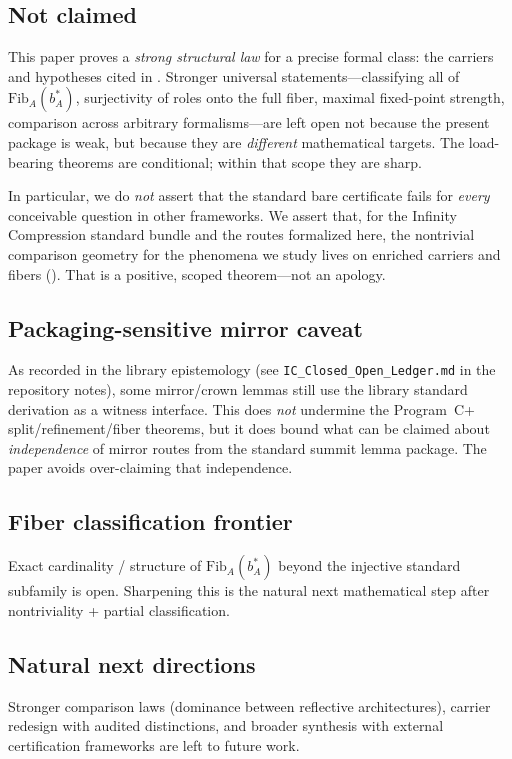 \documentclass[11pt]{article}
\begin{document}
\subsection{Not claimed}\label{sec:limitations-not-claimed}
This paper proves a \emph{strong structural law} for a precise formal class: the carriers and hypotheses cited in . Stronger universal statements---classifying all of $\mathrm{Fib}_A(b^\ast_A)$, surjectivity of roles onto the full fiber, maximal fixed-point strength, comparison across arbitrary formalisms---are left open not because the present package is weak, but because they are \emph{different} mathematical targets. The load-bearing theorems are conditional; within that scope they are sharp.

\smallskip
\noindent In particular, we do \emph{not} assert that the standard bare certificate fails for \emph{every} conceivable question in other frameworks. We assert that, for the Infinity Compression standard bundle and the routes formalized here, the nontrivial comparison geometry for the phenomena we study lives on enriched carriers and fibers (). That is a positive, scoped theorem---not an apology.

\subsection{Packaging-sensitive mirror caveat}\label{sec:limitations-packaging}
As recorded in the library epistemology (see \texttt{IC\_Closed\_Open\_Ledger.md} in the repository notes), some mirror/crown lemmas still use the library standard derivation as a witness interface. This does \emph{not} undermine the Program~C+ split/refinement/fiber theorems, but it does bound what can be claimed about \emph{independence} of mirror routes from the standard summit lemma package. The paper avoids over-claiming that independence.

\subsection{Fiber classification frontier}\label{sec:limitations-fiber}
Exact cardinality / structure of $\mathrm{Fib}_A(b^\ast_A)$ beyond the injective standard subfamily is open. Sharpening this is the natural next mathematical step after nontriviality + partial classification.

\subsection{Natural next directions}\label{sec:limitations-next}
Stronger comparison laws (dominance between reflective architectures), carrier redesign with audited distinctions, and broader synthesis with external certification frameworks are left to future work.
\end{document}
